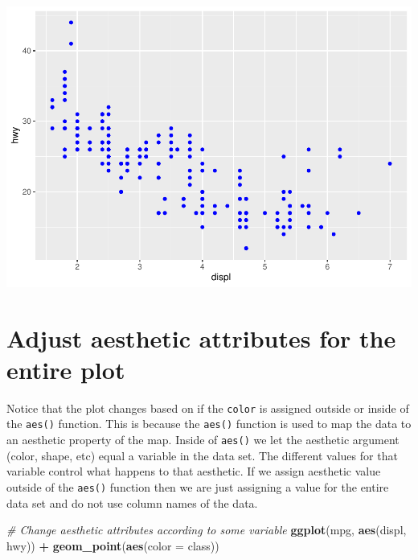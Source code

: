 \documentclass[
]{book}
\newenvironment{Shaded}{\begin{snugshade}}{\end{snugshade}}
\newcommand{\CommentTok}[1]{\textcolor[rgb]{0.56,0.35,0.01}{\textit{#1}}}
\newcommand{\DataTypeTok}[1]{\textcolor[rgb]{0.13,0.29,0.53}{#1}}
\newcommand{\KeywordTok}[1]{\textcolor[rgb]{0.13,0.29,0.53}{\textbf{#1}}}
\newcommand{\NormalTok}[1]{#1}
\newcommand{\OperatorTok}[1]{\textcolor[rgb]{0.81,0.36,0.00}{\textbf{#1}}}
\newcommand{\StringTok}[1]{\textcolor[rgb]{0.31,0.60,0.02}{#1}}
\begin{document}
\includegraphics{_main_files/figure-latex/unnamed-chunk-254-3.pdf}

\hypertarget{adjust-aesthetic-attributes-for-the-entire-plot}{%
\section{Adjust aesthetic attributes for the entire plot}\label{adjust-aesthetic-attributes-for-the-entire-plot}}

Notice that the plot changes based on if the \texttt{color} is assigned outside or inside of the \texttt{aes()} function. This is because the \texttt{aes()} function is used to map the data to an aesthetic property of the map. Inside of \texttt{aes()} we let the aesthetic argument (color, shape, etc) equal a variable in the data set. The different values for that variable control what happens to that aesthetic. If we assign aesthetic value outside of the \texttt{aes()} function then we are just assigning a value for the entire data set and do not use column names of the data.

\begin{Shaded}
\begin{Highlighting}[]
\CommentTok{# Change aesthetic attributes according to some variable}
\KeywordTok{ggplot}\NormalTok{(mpg, }\KeywordTok{aes}\NormalTok{(displ, hwy)) }\OperatorTok{+}\StringTok{ }\KeywordTok{geom_point}\NormalTok{(}\KeywordTok{aes}\NormalTok{(}\DataTypeTok{color =}\NormalTok{ class))}
\end{Highlighting}
\end{Shaded}
\end{document}
